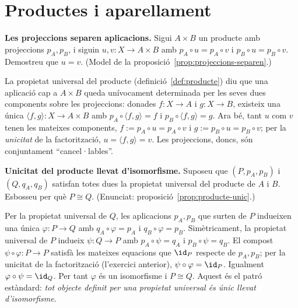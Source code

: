 \section{Productes i aparellament}\label{prac:productes}

\begin{exercici}
\textbf{Les projeccions separen aplicacions.} Sigui \(A\times B\) un producte amb projeccions \(p_A,p_B\), i siguin \(u,v:X\to A\times B\) amb \(p_A\circ u=p_A\circ v\) i \(p_B\circ u=p_B\circ v\). Demostreu que \(u=v\). (Model de la proposició~\ref{prop:projeccions-separen}.)
\end{exercici}
\begin{solucio}
La propietat universal del producte (definició~\ref{def:producte}) diu que una aplicació cap a \(A\times B\) queda unívocament determinada per les seves dues components sobre les projeccions: donades \(f:X\to A\) i \(g:X\to B\), existeix una única \(\langle f,g\rangle:X\to A\times B\) amb \(p_A\circ\langle f,g\rangle=f\) i \(p_B\circ\langle f,g\rangle=g\). Ara bé, tant \(u\) com \(v\) tenen les mateixes components, \(f:=p_A\circ u=p_A\circ v\) i \(g:=p_B\circ u=p_B\circ v\); per la \emph{unicitat} de la factorització, \(u=\langle f,g\rangle=v\). Les projeccions, doncs, són conjuntament \enquote{cancel·lables}.
\end{solucio}

\begin{exercici}
\textbf{Unicitat del producte llevat d'isomorfisme.} Suposeu que \((P,p_A,p_B)\) i \((Q,q_A,q_B)\) satisfan totes dues la propietat universal del producte de \(A\) i \(B\). Esbosseu per què \(P\cong Q\). (Enunciat: proposició~\ref{prop:producte-unic}.)
\end{exercici}
\begin{solucio}
Per la propietat universal de \(Q\), les aplicacions \(p_A,p_B\) que surten de \(P\) indueixen una única \(\varphi:P\to Q\) amb \(q_A\circ\varphi=p_A\) i \(q_B\circ\varphi=p_B\). Simètricament, la propietat universal de \(P\) indueix \(\psi:Q\to P\) amb \(p_A\circ\psi=q_A\) i \(p_B\circ\psi=q_B\). El compost \(\psi\circ\varphi:P\to P\) satisfà les mateixes equacions que \(\id_P\) respecte de \(p_A,p_B\); per la unicitat de la factorització (l'exercici anterior), \(\psi\circ\varphi=\id_P\). Igualment \(\varphi\circ\psi=\id_Q\). Per tant \(\varphi\) és un isomorfisme i \(P\cong Q\). Aquest és el patró estàndard: \emph{tot objecte definit per una propietat universal és únic llevat d'isomorfisme}.
\end{solucio}

